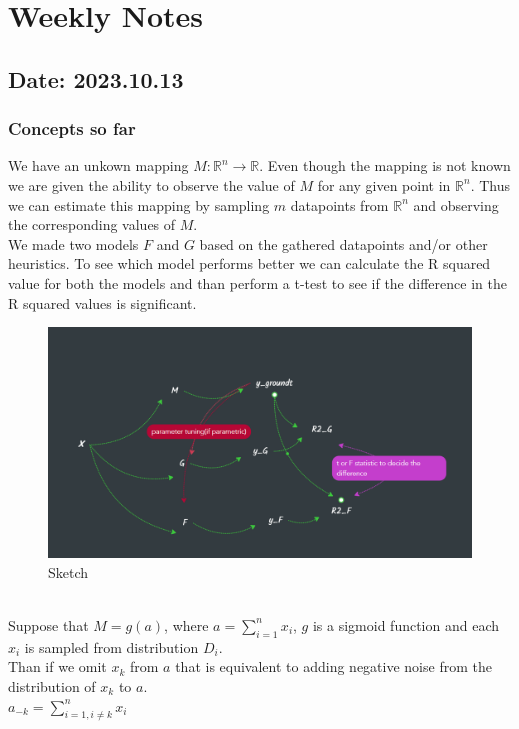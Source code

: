 \documentclass{article}
\begin{document}
\section*{Weekly Notes}

\subsection*{Date: 2023.10.13}

\subsubsection*{Concepts so far}
We have an unkown mapping $M: \mathbb{R}^n \rightarrow \mathbb{R}$. Even though the mapping is not known we are given the ability to observe the value of $M$ for any given point in $\mathbb{R}^n$.
Thus we can estimate this mapping by sampling $m$ datapoints from $\mathbb{R}^n$ and observing the corresponding values of $M$.
\\
We made two models $F$ and $G$ based on the gathered datapoints and/or other heuristics.
To see which model performs better we can calculate the R squared value for both the models and than perform a t-test to see if the difference in the R squared values is significant.
\\
\begin{figure}[h]
\centering
\includegraphics[width=1\textwidth]{sketch.png}
\caption{Sketch}
\end{figure}
\\
Suppose that $M=g(a)$, where $a=\sum_{i=1}^n x_i$, $g$ is a sigmoid function and each $x_i$ is sampled from distribution $D_i$.\\
Than if we omit $x_k$ from $a$ that is equivalent to adding negative noise from the distribution of $x_k$ to $a$.\\
$a_{-k}=\sum_{i=1, i\neq k}^n x_i$\\
\end{document}

